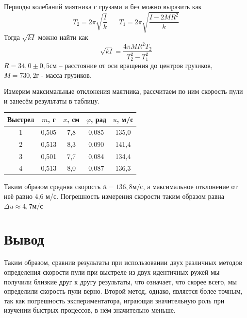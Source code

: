 \documentclass[a4paper, 12pt]{article}
\begin{document}
			Периоды колебаний маятника с грузами и без можно выразить как
			$$T_2 = 2 \pi \sqrt{\frac{I}{k}} \;\;\;\;\;\; T_1= 2 \pi \sqrt{\frac{I - 2MR^2}{k}}$$
			Тогда $\sqrt{kI}$ можно найти как 
			$$\sqrt{kI} = \frac{4 \pi M R^2 T_2}{T_2^2 - T_1^2}$$
			$R = 34,0 \pm 0,5 см$ -- расстояние от оси вращения до центров грузиков, $M = 730,2 г$ - масса грузиков.
			
			Измерим максимальные отклонения маятника, рассчитаем по ним скорость пули и занесём результаты в таблицу.
			\begin{longtable}{|c|c|c|c|c|}
				\hline
				Выстрел & $m$, г & $x$, см & $\varphi$, рад & $u$, м/с \\
				\hline
				1 & 0,505 & 7,8 & 0,085 &  135,0\\
				\hline
				2 & 0,513 & 8,3 & 0,090 &  141,4\\
				\hline
				3 & 0,501 & 7,7 & 0,084 &  134,4\\
				\hline
				4 & 0,513 & 8,0 & 0,087 &  136,3\\
				\hline
			\end{longtable}
		
			Таким образом средняя скорость $\overline{u} = 136,8 м/с$, а максимальное отклонение от неё равно 4,6 м/с. Погрешность измерения скорости таким образом равна $\Delta u \approx 4,7 м/с$
	\section*{Вывод}
		Таким образом, сравнив результаты при использовании двух различных методов определения скорости пули при выстреле из двух идентичных ружей мы получили близкие друг к другу результаты, что означает, что скорее всего, мы определили скорость пули верно. Второй метод, однако, является более точным, так как погрешность экспериментатора, играющая значительную роль при изучении быстрых процессов, в нём значительно меньше.
\end{document}

